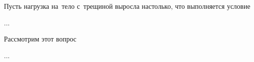 

\begin{otherlanguage}{russian}

Пусть нагрузка на~тело с~трещиной выросла настолько, что выполняется условие

...



\end{otherlanguage}



\begin{otherlanguage}{russian}

Рассмотрим этот вопрос

...



\end{otherlanguage}



